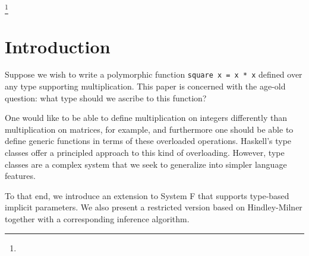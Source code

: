 \documentclass[acmlarge]{acmart}
\begin{document}
\newcommand\tmono{\tau}
\newcommand\tpoly{\sigma}
\newcommand\tvarempty{\epsilon_{\tpoly}}
\newcommand\tvar{\alpha}
\newcommand\tarrow[2]{#1 \rightarrow #2}
\newcommand\tforall[2]{\forall #1 \ . \ #2}
\newcommand\timp[2]{#1 \Rightarrow #2}
\newcommand\tforallimp[3]{\tforall{#1}{\timp{#2}{#3}}}
\newcommand\tgen[3]{\text{gen}\parens{#1, #2, #3}}
\newcommand\tinst[1]{\text{inst}(#1)}
\newcommand\tmgu[2]{\text{mgu}\parens{#1, #2}}

\newcommand\gcontext{\Gamma}
\newcommand\gempty{\epsilon_{\gcontext}}

\newcommand\icontext{\Delta}
\newcommand\iempty{\epsilon_{\icontext}}

\newcommand\ssub{\theta}
\newcommand\sempty{\epsilon_{\ssub}}
\newcommand\sub[3]{#1 \left[ #2 \mapsto #3 \right]}
\newcommand\slub[2]{#1 \vee #2}

\newcommand\utrans[2]{#1 \leadsto #2}
\newcommand\uelab[2]{#1 \hookrightarrow #2}
\newcommand\utovar[1]{\| #1 \|}



\terms{}



\thanks{
}


\maketitle

\section{Introduction}

  Suppose we wish to write a polymorphic function {\tt square x = x * x} defined over any type supporting multiplication. This paper is concerned with the age-old question: what type should we ascribe to this function?

  One would like to be able to define multiplication on integers differently than multiplication on matrices, for example, and furthermore one should be able to define generic functions in terms of these overloaded operations. Haskell's type classes \cite{typeclasses} offer a principled approach to this kind of overloading. However, type classes are a complex system that we seek to generalize into simpler language features.

  To that end, we introduce an extension to System F that supports type-based implicit parameters. We also present a restricted version based on Hindley-Milner together with a corresponding inference algorithm.
\end{document}
